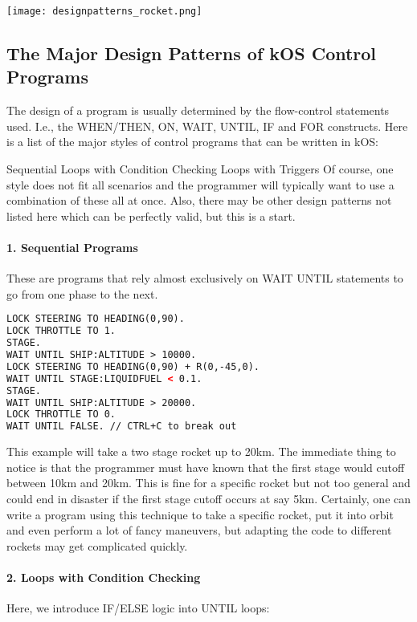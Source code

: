 \begin{center}
\texttt{[image: designpatterns\_rocket.png]}
\end{center}

\subsection{The Major Design Patterns of kOS Control Programs}
The design of a program is usually determined by the flow-control statements used. I.e., the WHEN/THEN, ON, WAIT, UNTIL, IF and FOR constructs. Here is a list of the major styles of control programs that can be written in kOS:

Sequential
Loops with Condition Checking
Loops with Triggers
Of course, one style does not fit all scenarios and the programmer will typically want to use a combination of these all at once. Also, there may be other design patterns not listed here which can be perfectly valid, but this is a start.

\paragraph{1. Sequential Programs}
These are programs that rely almost exclusively on WAIT UNTIL statements to go from one phase to the next.

\begin{lstlisting}[frame=single,language=XML]
LOCK STEERING TO HEADING(0,90).
LOCK THROTTLE TO 1.
STAGE.
WAIT UNTIL SHIP:ALTITUDE > 10000.
LOCK STEERING TO HEADING(0,90) + R(0,-45,0).
WAIT UNTIL STAGE:LIQUIDFUEL < 0.1.
STAGE.
WAIT UNTIL SHIP:ALTITUDE > 20000.
LOCK THROTTLE TO 0.
WAIT UNTIL FALSE. // CTRL+C to break out
\end{lstlisting} 

This example will take a two stage rocket up to 20km. The immediate thing to notice is that the programmer must have known that the first stage would cutoff between 10km and 20km. This is fine for a specific rocket but not too general and could end in disaster if the first stage cutoff occurs at say 5km. Certainly, one can write a program using this technique to take a specific rocket, put it into orbit and even perform a lot of fancy maneuvers, but adapting the code to different rockets may get complicated quickly.

\paragraph{2. Loops with Condition Checking}
Here, we introduce IF/ELSE logic into UNTIL loops:

